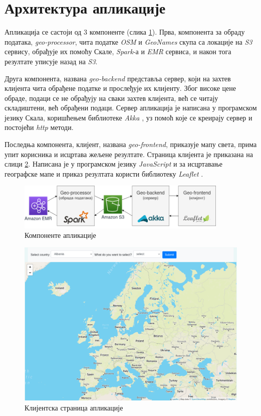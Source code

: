 \documentclass[12pt,oneside]{memoir}
\begin{document}
\section{Архитектура апликације}
\label{sec:app_aphi}

Апликација се састоји од 3 компоненте (слика \ref{fig:app_components}). Прва, компонента за обраду података, \textit{geo-processor}, чита податке \textit{OSM} и \textit{GeoNames} скупа са локације на \textit{S3} сервису, обрађује их помоћу Скале, \textit{Spark}-а и \textit{EMR} сервиса, и након тога резултате уписује назад на \textit{S3}. 

Друга компонента, названа \textit{geo-backend} представља сервер, који на захтев клијента чита обрађене податке и прослеђује их клијенту. Због високе цене обраде, подаци се не обрађују на сваки захтев клијента, већ се читају складиштени, већ обрађени подаци. Сервер апликација је написана у програмском језику Скала, коришћењем библиотеке \textit{Akka} \cite{scala_akka}, уз помоћ које се креирају сервер и постојећи \textit{http} методи.

Последња компонента, клијент, названа \textit{geo-frontend}, приказује мапу света, прима упит корисника и исцртава жељене резултате. Страница клијента је приказана на слици \ref{fig:app_front}. Написана је у програмском језику \textit{JavaScript} и за исцртавање географске мапе и приказ резултата користи библиотеку \textit{Leaflet} \cite{leaflet}.

\begin{figure}[!ht]
  \centering
  \includegraphics[width=0.9\textwidth]{pictures/app_arch_components.png}
  \caption{Компоненте апликације}
  \label{fig:app_components}
\end{figure}

\begin{figure}[!ht]
  \centering
  \includegraphics[width=1\textwidth]{pictures/geo_frontend.png}
  \caption{Клијентска страница апликације}
  \label{fig:app_front}
\end{figure}
\end{document}
